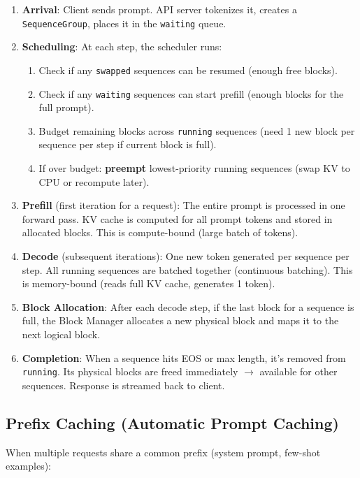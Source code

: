 \begin{enumerate}
  \item \textbf{Arrival}: Client sends prompt. API server tokenizes it, creates a \texttt{SequenceGroup}, places it in the \texttt{waiting} queue.
  \item \textbf{Scheduling}: At each step, the scheduler runs:

\begin{enumerate}
  \item Check if any \texttt{swapped} sequences can be resumed (enough free blocks).
  \item Check if any \texttt{waiting} sequences can start prefill (enough blocks for the full prompt).
  \item Budget remaining blocks across \texttt{running} sequences (need 1 new block per sequence per step if current block is full).
  \item If over budget: \textbf{preempt} lowest-priority running sequences (swap KV to CPU or recompute later).
\end{enumerate}
  \item \textbf{Prefill} (first iteration for a request): The entire prompt is processed in one forward pass. KV cache is computed for all prompt tokens and stored in allocated blocks. This is compute-bound (large batch of tokens).
  \item \textbf{Decode} (subsequent iterations): One new token generated per sequence per step. All running sequences are batched together (continuous batching). This is memory-bound (reads full KV cache, generates 1 token).
  \item \textbf{Block Allocation}: After each decode step, if the last block for a sequence is full, the Block Manager allocates a new physical block and maps it to the next logical block.
  \item \textbf{Completion}: When a sequence hits EOS or max length, it’s removed from \texttt{running}. Its physical blocks are freed immediately $\rightarrow$ available for other sequences. Response is streamed back to client.
\end{enumerate}

\subsection{Prefix Caching (Automatic Prompt Caching)}
\label{prefix-caching-automatic-prompt-caching}

When multiple requests share a common prefix (system prompt, few-shot examples):

